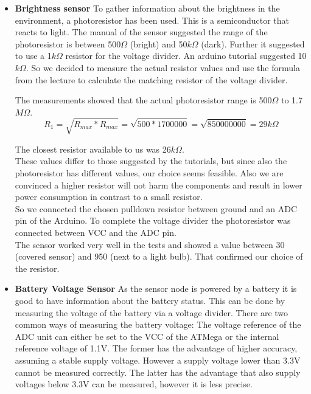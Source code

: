 \begin{itemize}
\item \textbf{Brightness sensor}
To gather information about the brightness in the environment, a photoresistor has been used. This is a semiconductor that reacts to light. The manual of the sensor suggested the range of the photoresistor is between 500$\Omega$ (bright) and 50$k\Omega$ (dark). 
Further it suggested to use a 1$k\Omega$ resistor for the voltage divider. An arduino tutorial \citep{misc:photoresistor_tutorial} suggested 10 $k\Omega$. So we decided to measure the actual resistor values and use the formula from the lecture to calculate the matching resistor of the voltage divider. %

The measurements showed that the actual photoresistor range is 500$\Omega$ to 1.7$M\Omega$.\\
\begin{equation}
R_1 = \sqrt{R_{max}*R_{max}} = \sqrt{500*1700000} = \sqrt{850000000} = 29k\Omega
\end{equation}


The closest resistor available to us was 26$k\Omega$.\\
These values differ to those suggested by the tutorials, but since also the photoresistor has different values, our choice seems feasible. Also we are convinced a higher resistor will not harm the components and result in lower power consumption in contrast to a small resistor.\\
So we connected the chosen pulldown resistor between ground and an ADC pin of the Arduino. To complete the voltage divider the photoresistor was connected between VCC and the ADC pin.\\

The sensor worked very well in the tests and showed a value between 30 (covered sensor) and 950 (next to a light bulb). That confirmed our choice of the resistor.\\


\item \textbf{Battery Voltage Sensor}
As the sensor node is powered by a battery it is good to have information about the battery status.
This can be done by measuring the voltage of the battery via a voltage divider. There are two common ways of measuring the battery voltage:
The voltage reference of the ADC unit can either be set to the VCC of the ATMega or the internal reference voltage of 1.1V.
The former has the advantage of higher accuracy, assuming a stable supply voltage. However a supply voltage lower than 3.3V cannot be measured correctly. The latter has the advantage that also supply voltages below 3.3V can be measured, however it is less precise.





\end{itemize}



